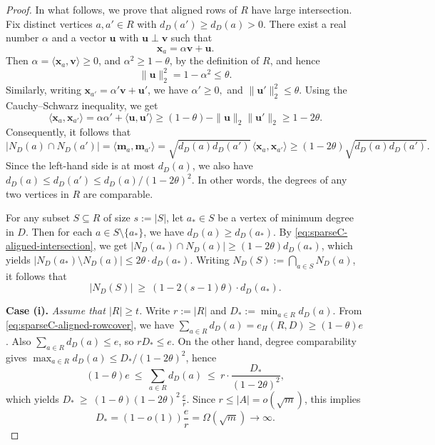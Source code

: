 \documentclass[10pt,a4paper]{amsart}
\begin{document}
\begin{proof}
In what follows, we prove that 
aligned rows of $R$ have large intersection. 
Fix distinct vertices $a,a'\in R$ with $d_D(a')\ge d_D(a)>0$. 
There exist a real number $\alpha$ and a vector $\bm{u}$ with $\bm{u}\perp \bm{v}$ such that 
\[
        \bm{x}_a=\alpha \bm{v}+ \bm{u}.
\]
Then $\alpha=\langle \bm{x}_a,\bm v\rangle\ge0$, and $\alpha^2\ge 1-\theta$, by the definition of \(R\), and hence
\[
        \|\bm{u}\|_2^2=1-\alpha^2\le \theta.
\]
Similarly, writing \(\bm{x}_{a'}=\alpha'\bm v+\bm u'\), we have $\alpha'\ge0,$ and $
\|\bm{u}'\|_2^2\le \theta.$
Using the Cauchy--Schwarz inequality, we get 
\begin{equation}
  \langle \bm{x}_a, \bm{x}_{a'} \rangle
  =\alpha\alpha'+\langle \bm{u}, \bm{u}'\rangle
  \ge (1-\theta)-\|\bm{u}\|_2\|\bm{u}'\|_2
  \ge 1-2\theta.
\end{equation}
Consequently, it follows that 
\begin{equation}\label{eq:sparseC-aligned-intersection}
  |N_D(a)\cap N_D(a') |
  =
  \langle \bm{m}_a,\bm{m}_{a'}\rangle
  =
  \sqrt{d_D(a)d_D(a')}\,\langle \bm{x}_a,\bm{x}_{a'}\rangle
  \ge (1-2\theta)\sqrt{d_D(a)d_D(a')}.
\end{equation}
Since the left-hand side is at most $d_D(a)$, we also have $d_D(a)\le d_D(a')\le d_D(a)/(1-2\theta)^2$. In other words, the degrees of any two vertices in $R$ are comparable. 

For any subset $S\subseteq R$ of size $s:=|S|$, let $a_\ast\in S$ be a vertex of minimum degree in $D$. Then for 
each $a\in S\setminus\{a_\ast\}$, we have 
$d_D(a)\ge d_D(a_\ast)$. 
By \eqref{eq:sparseC-aligned-intersection}, we get 
$|N_D(a_\ast) \cap N_D(a)| \ge (1-2\theta)d_D(a_\ast)$, which yields 
$|N_D(a_\ast) \setminus N_D(a)|\le 2\theta \cdot d_D(a_\ast)$.
Writing $N_D(S):=\bigcap_{a\in S}N_D(a)$, it follows that 
\begin{equation}\label{eq:sparseC-aligned-common-neighborhood}
  |N_D(S)|\ \ge\ (1-2(s-1)\theta) \cdot d_D(a_\ast).
\end{equation}

\smallskip
\noindent
{\bf  Case (i).} 
{\it Assume that $|R|\ge t$.}
Write $r:=|R|$ and $D_\ast:=\min_{a\in R}d_D(a)$. 
From \eqref{eq:sparseC-aligned-rowcover}, we have $\sum_{a\in R}d_D(a)=e_H(R,D)\ge (1-\theta)e$.
Also $\sum_{a\in R}d_D(a)\le e$, so $rD_\ast\le e$.
On the other hand, degree comparability gives $\max_{a\in R}d_D(a)\le D_\ast/(1-2\theta)^2$, hence
\[
  (1-\theta)e\ \le\ \sum_{a\in R}d_D(a)\ \le\ r\cdot \frac{D_\ast}{(1-2\theta)^2},
\]
which yields $D_\ast\ \ge\ (1-\theta)(1-2\theta)^2\,\frac{e}{r}.$
Since $r\le |A|=o(\sqrt{m})$, this implies 
\[
        D_\ast = (1-o(1)) \frac{e}{r}= \Omega (\sqrt{m}) \to\infty.
\]


\end{proof}
\end{document}
